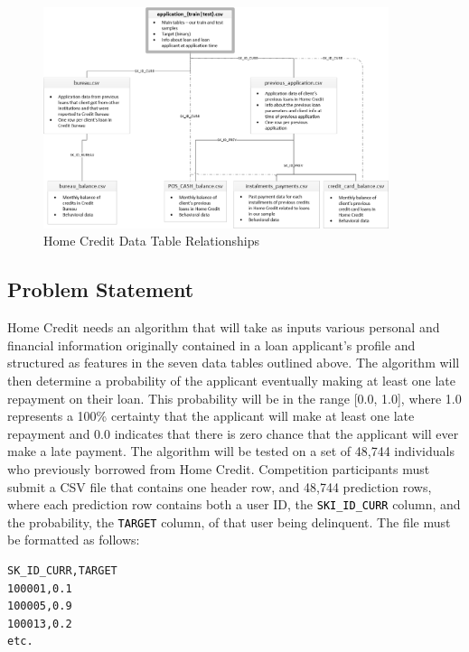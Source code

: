 \documentclass[12pt, letterpaper]{article}
\begin{document}
\pagebreak

\begin{figure}[h!]
\includegraphics[width=0.9\textwidth]{homecredit}
\centering
\caption{Home Credit Data Table Relationships\cite{kagglehomecreditcompetitiondata}}
\end{figure}

\subsection{Problem Statement}
Home Credit needs an algorithm that will take as inputs various personal and financial information originally contained in a loan applicant's profile and structured as features in the seven data tables outlined above. The algorithm will then determine a probability of the applicant eventually making at least one late repayment on their loan. This probability will be in the range [0.0, 1.0], where 1.0 represents a 100\% certainty that the applicant will make at least one late repayment and 0.0 indicates that there is zero chance that the applicant will ever make a late payment. The algorithm will be tested on a set of 48,744 individuals who previously borrowed from Home Credit. Competition participants must submit a CSV file that contains one header row, and 48,744 prediction rows, where each prediction row contains both a user ID, the \colorbox{backcolor}{\textcolor{black}{\texttt{SKI_ID_CURR}}} column, and the probability, the \colorbox{backcolor}{\textcolor{black}{\texttt{TARGET}}} column, of that user being delinquent. The file must be formatted as follows:

\begin{lstlisting}
SK_ID_CURR,TARGET
100001,0.1
100005,0.9
100013,0.2
etc.
\end{lstlisting}
\end{document}
